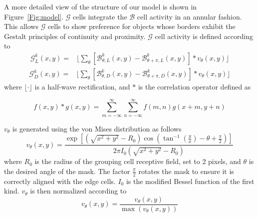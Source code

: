 A more detailed view of the structure of our model is shown in Figure~\ref{Fig:model}. $\mathcal{G}$ cells integrate the $\mathcal{B}$ cell activity in an annular fashion. This allows $\mathcal{G}$ cells to show preference for objects whose borders exhibit the Gestalt principles of continuity and proximity. $\mathcal{G}$ cell activity is defined according to
\begin{equation}
\begin{split}
\mathcal{G}_{L}^k(x,y) = &\Bigg\lfloor\sum_\theta
                     [\mathcal{B}^k_{\theta,L}(x,y)-\mathcal{B}^k_{\theta+\pi,L}(x,y)]\ast v_\theta(x,y)\Bigg\rfloor
\end{split}
\label{eq:G_L}
\end{equation}
\begin{equation}
\begin{split}
\mathcal{G}_{D}^k(x,y) = &\Bigg\lfloor\sum_\theta
                     [\mathcal{B}^k_{\theta,D}(x,y)-\mathcal{B}^k_{\theta+\pi,D}(x,y)]\ast v_\theta(x,y)\Bigg\rfloor
\end{split}
\label{eq:G_D}
\end{equation}
where $\lfloor \cdot \rfloor$ is a half-wave rectification, and $\ast$ is the correlation operator defined as

\begin{equation}
f(x,y)\ast g(x,y) = \sum_{m=-\infty}^{\infty}\sum_{n=-\infty}^{\infty}f(m,n)g(x+m,y+n)
\end{equation}

$v_{\theta}$ is generated using the von Mises distribution as follows
\begin{equation}
v_\theta(x,y) = \frac{\exp\left[(\sqrt{x^2+y^2}-R_0)\cos(\tan^{-1}(\frac{y}{x})-\theta+\frac{\pi}{2})\right]}{2\pi I_0(\sqrt{x^2+y^2}-R_0)}
\label{eq:vonMises}
\end{equation}
where $R_0$ is the radius of the grouping cell receptive field, set to 2 pixels, and $\theta$ is the desired angle of the mask. The factor $\frac{\pi}{2}$ rotates the mask to ensure it is correctly aligned with the edge cells. $I_0$ is the modified Bessel function of the first kind. $v_\theta$ is then normalized according to
\begin{equation}
v_\theta(x,y) = \frac{v_\theta(x,y)}{\max(v_\theta(x,y))}
\end{equation}

